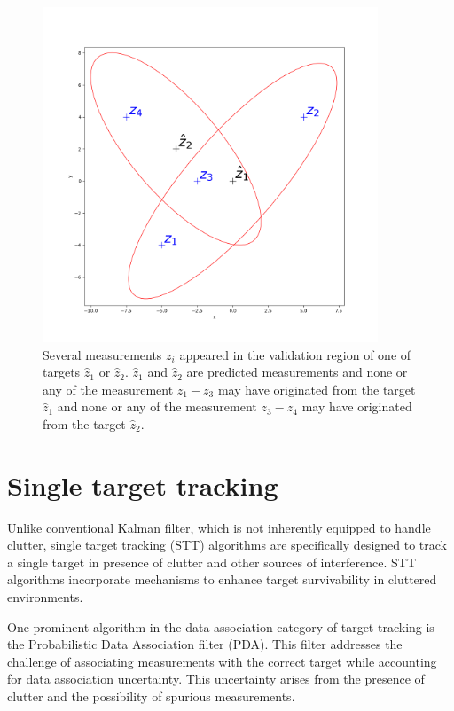 \begin{figure}[H]
    \centering
    \includegraphics[width=10cm]{text/chapter_02/imgs/clutter_multiTarget}
    \caption{Several measurements $z_i$ appeared in the validation region of one of targets $\hat{z}_1$ or $\hat{z}_2$. $\hat{z}_1$ and $\hat{z}_2$ are predicted
    measurements and none or any of the measurement $z_1 - z_3$ may have originated from the target $\hat{z}_1$ and none or any of the measurement $z_3 - z_4$ may have originated from the target $\hat{z}_2$.}
    \label{fig:twoTargetsInClutter}
\end{figure}


\section{Single target tracking}
Unlike conventional Kalman filter, which is not inherently equipped to handle clutter, single target tracking (STT) algorithms are specifically designed to track a single target in presence of clutter and other
sources
of interference. STT algorithms incorporate mechanisms to enhance target survivability in cluttered environments.

One prominent algorithm in the data association category of target tracking is the Probabilistic Data Association
filter (PDA). This filter addresses the challenge of associating measurements with the correct target while
accounting
for data association uncertainty. This uncertainty arises from the presence of clutter and the possibility of spurious measurements.


